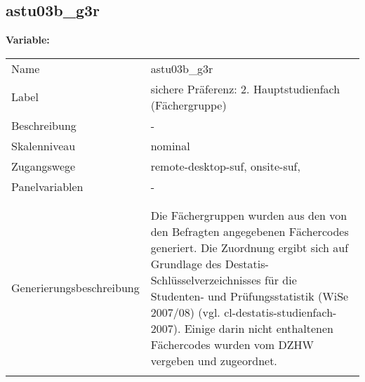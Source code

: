 	
	
	\subsection{astu03b\_g3r}
	\label{subSection:astu03b_g3r}

	\noindent\textbf{Variable:}\\
		\begin{tabular}{lL{11.3cm}}
			\label{tableVariable:astu03b_g3r}
			Name & astu03b\_g3r \\
			Label & sichere Präferenz: 2. Hauptstudienfach  (Fächergruppe) \\
			Beschreibung & - \\
			Skalenniveau & nominal \\
			Zugangswege &
				remote-desktop-suf,
				onsite-suf,
 \\
			Panelvariablen & -
			 \\
			 \\
 \\
					Generierungsbeschreibung & Die Fächergruppen wurden aus den von den Befragten angegebenen Fächercodes generiert. Die Zuordnung ergibt sich auf Grundlage des Destatis-Schlüsselverzeichnisses für die Studenten- und Prüfungsstatistik (WiSe 2007/08) (vgl. cl-destatis-studienfach-2007).  Einige darin nicht enthaltenen Fächercodes wurden vom DZHW vergeben und zugeordnet. 
				 \\	
			 \\
		\end{tabular}






